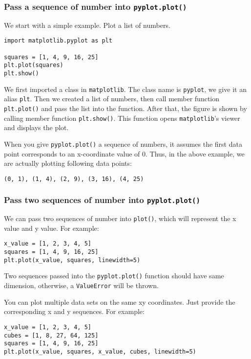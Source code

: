 \documentclass[12pt]{book}
\begin{document}
\subsubsection{Pass a sequence of number into \texttt{pyplot.plot()}}
\label{sec:org969b8d4}
We start with a simple example. Plot a list of numbers.
\begin{verbatim}
import matplotlib.pyplot as plt

squares = [1, 4, 9, 16, 25]
plt.plot(squares)
plt.show()
\end{verbatim}
We first imported a class in \texttt{matplotlib}. The class name is \texttt{pyplot}, we give it an alias \texttt{plt}. Then we created a list of numbers, then call member function \texttt{plt.plot()} and pass the list into the function. After that, the figure is shown by calling member function \texttt{plt.show()}. This function opens \texttt{matplotlib}'s viewer and displays the plot.

When you give \texttt{pyplot.plot()} a sequence of numbers, it assumes the first data point corresponds to an x-coordinate value of 0. Thus, in the above example, we are actually plotting following data points:
\begin{verbatim}
(0, 1), (1, 4), (2, 9), (3, 16), (4, 25)
\end{verbatim}
\subsubsection{Pass two sequences of number into \texttt{pyplot.plot()}}
\label{sec:orgb13d6a5}
We can pass two sequences of number into \texttt{plot()}, which will represent the x value and y value. For example:
\begin{verbatim}
x_value = [1, 2, 3, 4, 5]
squares = [1, 4, 9, 16, 25]
plt.plot(x_value, squares, linewidth=5)
\end{verbatim}
Two sequences passed into the \texttt{pyplot.plot()} function should have same dimension, otherwise, a \texttt{ValueError} will be thrown.

You can plot multiple data sets on the same xy coordinates. Just provide the corresponding x and y sequences. For example:
\begin{verbatim}
x_value = [1, 2, 3, 4, 5]
cubes = [1, 8, 27, 64, 125]
squares = [1, 4, 9, 16, 25]
plt.plot(x_value, squares, x_value, cubes, linewidth=5)
\end{verbatim}
\end{document}
